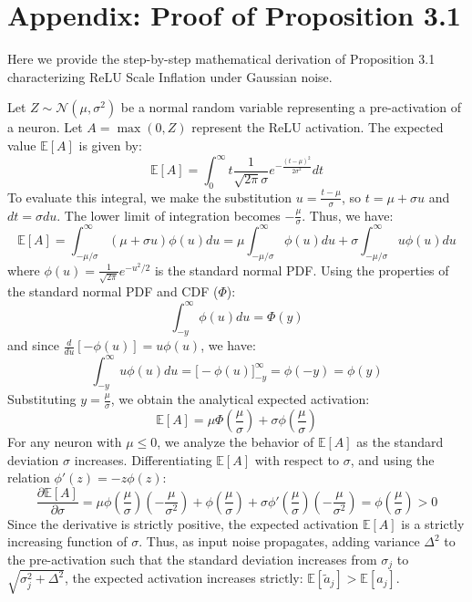 \documentclass{article}
\theoremstyle{plain}
\theoremstyle{definition}
\theoremstyle{remark}
\begin{document}



\newpage
\onecolumn
\section*{Appendix: Proof of Proposition 3.1}
Here we provide the step-by-step mathematical derivation of Proposition 3.1 characterizing ReLU Scale Inflation under Gaussian noise.

Let $Z \sim \mathcal{N}(\mu, \sigma^2)$ be a normal random variable representing a pre-activation of a neuron. Let $A = \max(0, Z)$ represent the ReLU activation. The expected value $\mathbb{E}[A]$ is given by:
\begin{equation}
\mathbb{E}[A] = \int_{0}^{\infty} t \frac{1}{\sqrt{2\pi}\sigma} e^{-\frac{(t-\mu)^2}{2\sigma^2}} dt
\end{equation}
To evaluate this integral, we make the substitution $u = \frac{t-\mu}{\sigma}$, so $t = \mu + \sigma u$ and $dt = \sigma du$. The lower limit of integration becomes $-\frac{\mu}{\sigma}$. Thus, we have:
\begin{equation}
\mathbb{E}[A] = \int_{-\mu/\sigma}^{\infty} (\mu + \sigma u) \phi(u) du = \mu \int_{-\mu/\sigma}^{\infty} \phi(u) du + \sigma \int_{-\mu/\sigma}^{\infty} u \phi(u) du
\end{equation}
where $\phi(u) = \frac{1}{\sqrt{2\pi}} e^{-u^2/2}$ is the standard normal PDF.
Using the properties of the standard normal PDF and CDF ($\Phi$):
\begin{equation}
\int_{-y}^{\infty} \phi(u) du = \Phi(y)
\end{equation}
and since $\frac{d}{du}[-\phi(u)] = u\phi(u)$, we have:
\begin{equation}
\int_{-y}^{\infty} u \phi(u) du = \big[-\phi(u)\big]_{-y}^{\infty} = \phi(-y) = \phi(y)
\end{equation}
Substituting $y = \frac{\mu}{\sigma}$, we obtain the analytical expected activation:
\begin{equation}
\mathbb{E}[A] = \mu \Phi\left(\frac{\mu}{\sigma}\right) + \sigma \phi\left(\frac{\mu}{\sigma}\right)
\end{equation}
For any neuron with $\mu \le 0$, we analyze the behavior of $\mathbb{E}[A]$ as the standard deviation $\sigma$ increases. Differentiating $\mathbb{E}[A]$ with respect to $\sigma$, and using the relation $\phi'(z) = -z\phi(z)$:
\begin{equation}
\frac{\partial \mathbb{E}[A]}{\partial \sigma} = \mu \phi\left(\frac{\mu}{\sigma}\right) \left(-\frac{\mu}{\sigma^2}\right) + \phi\left(\frac{\mu}{\sigma}\right) + \sigma \phi'\left(\frac{\mu}{\sigma}\right) \left(-\frac{\mu}{\sigma^2}\right) = \phi\left(\frac{\mu}{\sigma}\right) > 0
\end{equation}
Since the derivative is strictly positive, the expected activation $\mathbb{E}[A]$ is a strictly increasing function of $\sigma$. Thus, as input noise propagates, adding variance $\Delta^2$ to the pre-activation such that the standard deviation increases from $\sigma_j$ to $\sqrt{\sigma_j^2 + \Delta^2}$, the expected activation increases strictly: $\mathbb{E}[\tilde{a}_j] > \mathbb{E}[a_j]$.
\end{document}
